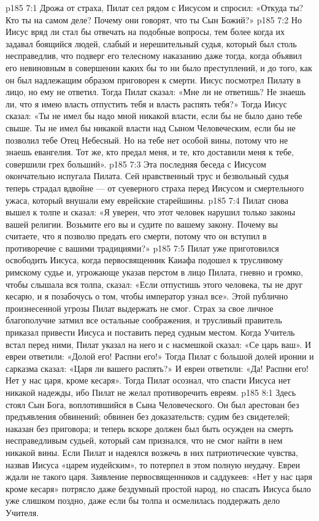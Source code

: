 \vs p185 7:1 Дрожа от страха, Пилат сел рядом с Иисусом и спросил: «Откуда ты? Кто ты на самом деле? Почему они говорят, что ты Сын Божий?»
\vs p185 7:2 Но Иисус вряд ли стал бы отвечать на подобные вопросы, тем более когда их задавал боящийся людей, слабый и нерешительный судья, который был столь несправедлив, что подверг его телесному наказанию даже тогда, когда объявил его невиновным в совершении каких бы то ни было преступлений, и до того, как он был надлежащим образом приговорен к смерти. Иисус посмотрел Пилату в лицо, но ему не ответил. Тогда Пилат сказал: «Мне ли не ответишь? Не знаешь ли, что я имею власть отпустить тебя и власть распять тебя?» Тогда Иисус сказал: «Ты не имел бы надо мной никакой власти, если бы не было дано тебе свыше. Ты не имел бы никакой власти над Сыном Человеческим, если бы не позволил тебе Отец Небесный. Но на тебе нет особой вины, потому что не знаешь евангелия. Тот же, кто предал меня, и те, кто доставили меня к тебе, совершили грех больший».
\vs p185 7:3 Эта последняя беседа с Иисусом окончательно испугала Пилата. Сей нравственный трус и безвольный судья теперь страдал вдвойне --- от суеверного страха перед Иисусом и смертельного ужаса, который внушали ему еврейские старейшины.
\vs p185 7:4 Пилат снова вышел к толпе и сказал: «Я уверен, что этот человек нарушил только законы вашей религии. Возьмите его вы и судите по вашему закону. Почему вы считаете, что я позволю предать его смерти, потому что он вступил в противоречие с вашими традициями?»
\vs p185 7:5 Пилат уже приготовился освободить Иисуса, когда первосвященник Каиафа подошел к трусливому римскому судье и, угрожающе указав перстом в лицо Пилата, гневно и громко, чтобы слышала вся толпа, сказал: «Если отпустишь этого человека, ты не друг кесарю, и я позабочусь о том, чтобы император узнал все». Этой публично произнесенной угрозы Пилат выдержать не смог. Страх за свое личное благополучие затмил все остальные соображения, и трусливый правитель приказал привести Иисуса и поставить перед судным местом. Когда Учитель встал перед ними, Пилат указал на него и с насмешкой сказал: «Се царь ваш». И евреи ответили: «Долой его! Распни его!» Тогда Пилат с большой долей иронии и сарказма сказал: «Царя ли вашего распять?» И евреи ответили: «Да! Распни его! Нет у нас царя, кроме кесаря». Тогда Пилат осознал, что спасти Иисуса нет никакой надежды, ибо Пилат не желал противоречить евреям.
\vs p185 8:1 Здесь стоял Сын Бога, воплотившийся в Сына Человеческого. Он был арестован без предъявления обвинений; обвинен без доказательств; судим без свидетелей; наказан без приговора; и теперь вскоре должен был быть осужден на смерть несправедливым судьей, который сам признался, что не смог найти в нем никакой вины. Если Пилат и надеялся возжечь в них патриотические чувства, назвав Иисуса «царем иудейским», то потерпел в этом полную неудачу. Евреи ждали не такого царя. Заявление первосвященников и саддукеев: «Нет у нас царя кроме кесаря» потрясло даже бездумный простой народ, но спасать Иисуса было уже слишком поздно, даже если бы толпа и осмелилась поддержать дело Учителя.
